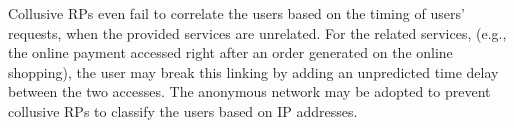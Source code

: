 \begin{itemize}

\end{itemize}

Collusive RPs even fail to correlate the users based on the timing of users' requests, when the provided services are unrelated. For the related services, (e.g., the online payment accessed right after an order generated on the online shopping), the user may break this linking by adding an unpredicted time delay between the two accesses. The anonymous network may be adopted to prevent collusive RPs to classify the users based on IP addresses.


